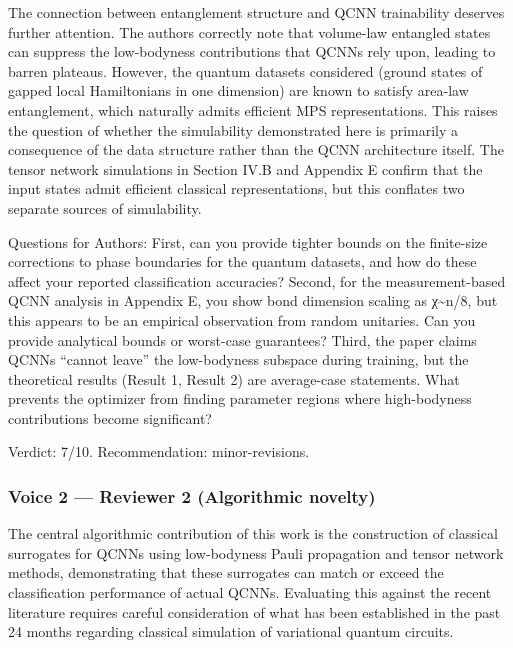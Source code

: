 \documentclass[10pt,letterpaper]{article}
\begin{document}
The connection between entanglement structure and QCNN trainability deserves further attention. The authors correctly note that volume-law entangled states can suppress the low-bodyness contributions that QCNNs rely upon, leading to barren plateaus. However, the quantum datasets considered (ground states of gapped local Hamiltonians in one dimension) are known to satisfy area-law entanglement, which naturally admits efficient MPS representations. This raises the question of whether the simulability demonstrated here is primarily a consequence of the data structure rather than the QCNN architecture itself. The tensor network simulations in Section IV.B and Appendix E confirm that the input states admit efficient classical representations, but this conflates two separate sources of simulability.

Questions for Authors: First, can you provide tighter bounds on the finite-size corrections to phase boundaries for the quantum datasets, and how do these affect your reported classification accuracies? Second, for the measurement-based QCNN analysis in Appendix E, you show bond dimension scaling as χ\textasciitilde n/8, but this appears to be an empirical observation from random unitaries. Can you provide analytical bounds or worst-case guarantees? Third, the paper claims QCNNs ``cannot leave'' the low-bodyness subspace during training, but the theoretical results (Result 1, Result 2) are average-case statements. What prevents the optimizer from finding parameter regions where high-bodyness contributions become significant?

Verdict: 7/10. Recommendation: minor-revisions.

\hypertarget{voice-2-reviewer-2-algorithmic-novelty}{%
\subsubsection{Voice 2 --- Reviewer 2 (Algorithmic novelty)}\label{voice-2-reviewer-2-algorithmic-novelty}}

The central algorithmic contribution of this work is the construction of classical surrogates for QCNNs using low-bodyness Pauli propagation and tensor network methods, demonstrating that these surrogates can match or exceed the classification performance of actual QCNNs. Evaluating this against the recent literature requires careful consideration of what has been established in the past 24 months regarding classical simulation of variational quantum circuits.
\end{document}
